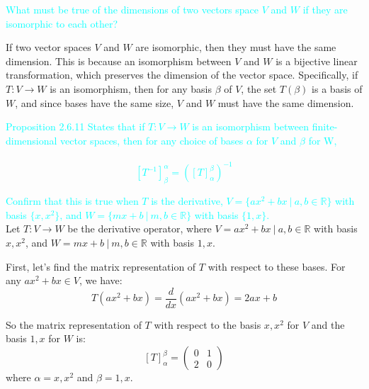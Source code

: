 \documentclass[fontsize=12pt]{scrartcl}
\begin{document}
\noindent
\textcolor{cyan}{What must be true of the dimensions of two vectors space $V$ and $W$ if they are isomorphic to each other?}

\noindent
If two vector spaces $V$ and $W$ are isomorphic, then they must have the same dimension. This is because an isomorphism between $V$ and $W$ is a bijective linear transformation, which preserves the dimension of the vector space. Specifically, if $T: V \rightarrow W$ is an isomorphism, then for any basis $\beta$ of $V$, the set $T(\beta)$ is a basis of $W$, and since bases have the same size, $V$ and $W$ must have the same dimension.

\newpage

\noindent
\textcolor{cyan}{Proposition 2.6.11 States that if $T: V \to W$ is an isomorphism between finite-dimensional vector spaces, then for any choice of bases $\alpha$ for $V$ and $\beta$ for W,}\\
\\
\textcolor{cyan}{$$[T^{-1}]_{\beta}^{\alpha} = \left( [T]_{\alpha}^{\beta}\right)^{-1}$$}

\bigskip

\noindent
\textcolor{cyan}{Confirm that this is true when $T$ is the derivative, $V = \{ ax^2 + bx \ | \ a,b \in \mathbb{R} \}$ with basis $\{x, x^2\}$, and $W = \{mx + b \ | \ m,b \in \mathbb{R} \}$ with basis $\{1, x\}$.}\\
\noindent
Let $T: V \rightarrow W$ be the derivative operator, where $V = { ax^2 + bx \ | \ a,b \in \mathbb{R} }$ with basis ${x, x^2}$, and $W = {mx + b \ | \ m,b \in \mathbb{R} }$ with basis ${1, x}$.

\noindent
First, let's find the matrix representation of $T$ with respect to these bases. For any $ax^2 + bx \in V$, we have:
$$T(ax^2 + bx) = \frac{d}{dx}(ax^2 + bx) = 2ax + b $$

\noindent
So the matrix representation of $T$ with respect to the basis ${x, x^2}$ for $V$ and the basis ${1, x}$ for $W$ is:
$$[T]_{\alpha}^{\beta} = \left(\begin{array}{cc} 0 & 1 \\ 2 & 0 \end{array} \right) $$
\noindent
where $\alpha = {x, x^2}$ and $\beta = {1, x}$.
\end{document}
